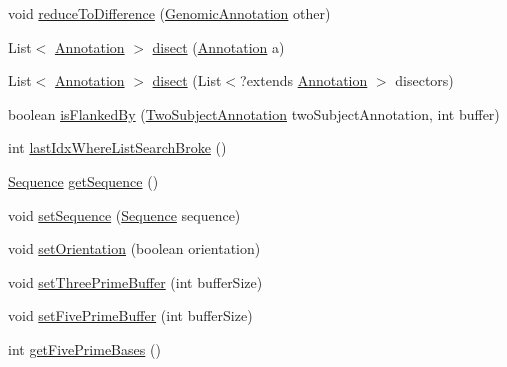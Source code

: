 \begin{DoxyCompactItemize}
void \hyperlink{classbroad_1_1core_1_1annotation_1_1_basic_genomic_annotation_aae52f0396a44e84344f41f23cb83022e}{reduce\+To\+Difference} (\hyperlink{interfacebroad_1_1core_1_1annotation_1_1_genomic_annotation}{Genomic\+Annotation} other)
\item 
List$<$ \hyperlink{interfaceumms_1_1core_1_1annotation_1_1_annotation}{Annotation} $>$ \hyperlink{classbroad_1_1core_1_1annotation_1_1_basic_genomic_annotation_a500d51a415b92e638ab83723af56dff0}{disect} (\hyperlink{interfaceumms_1_1core_1_1annotation_1_1_annotation}{Annotation} a)
\item 
List$<$ \hyperlink{interfaceumms_1_1core_1_1annotation_1_1_annotation}{Annotation} $>$ \hyperlink{classbroad_1_1core_1_1annotation_1_1_basic_genomic_annotation_a84d5b1f3fb2649e5ea53442edebd65b3}{disect} (List$<$?extends \hyperlink{interfaceumms_1_1core_1_1annotation_1_1_annotation}{Annotation} $>$ disectors)
\item 
boolean \hyperlink{classbroad_1_1core_1_1annotation_1_1_basic_genomic_annotation_a2b03867be090a45c5526631d5e661916}{is\+Flanked\+By} (\hyperlink{interfacebroad_1_1core_1_1annotation_1_1_two_subject_annotation}{Two\+Subject\+Annotation} two\+Subject\+Annotation, int buffer)
\item 
int \hyperlink{classbroad_1_1core_1_1annotation_1_1_basic_genomic_annotation_a91a4d0241674a75b27ced4cf40e563bc}{last\+Idx\+Where\+List\+Search\+Broke} ()
\item 
\hyperlink{classbroad_1_1core_1_1sequence_1_1_sequence}{Sequence} \hyperlink{classbroad_1_1core_1_1annotation_1_1_basic_genomic_annotation_aaa7708e6458bd5b16eade5e931ed917a}{get\+Sequence} ()
\item 
void \hyperlink{classbroad_1_1core_1_1annotation_1_1_basic_genomic_annotation_a93be2deada3f253081b40fdb92e6f67a}{set\+Sequence} (\hyperlink{classbroad_1_1core_1_1sequence_1_1_sequence}{Sequence} sequence)
\item 
void \hyperlink{classbroad_1_1core_1_1annotation_1_1_basic_genomic_annotation_a29df7ed3a39e72b77042d4625b536f1b}{set\+Orientation} (boolean orientation)
\item 
void \hyperlink{classbroad_1_1core_1_1annotation_1_1_basic_genomic_annotation_a7af507977197ffb1c8e7c1874cfbd7b9}{set\+Three\+Prime\+Buffer} (int buffer\+Size)
\item 
void \hyperlink{classbroad_1_1core_1_1annotation_1_1_basic_genomic_annotation_af0dcab996373305af00c42a58d8f62e9}{set\+Five\+Prime\+Buffer} (int buffer\+Size)
\item 
int \hyperlink{classbroad_1_1core_1_1annotation_1_1_basic_genomic_annotation_a8ed2dc419963ef16a12b10e038b772f1}{get\+Five\+Prime\+Bases} ()

\end{DoxyCompactItemize}
